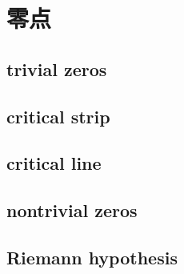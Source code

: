 \section{零点}
\label{b3:sec:2605}


\subsection{trivial zeros}
\label{b3:subsec:260501}

\subsection{critical strip}
\label{b3:subsec:260502}

\subsection{critical line}
\label{b3:subsec:260503}

\subsection{nontrivial zeros}
\label{b3:subsec:260504}

\subsection{Riemann hypothesis}
\label{b3:subsec:260505}


